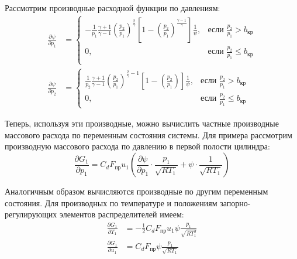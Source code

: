Рассмотрим производные расходной функции по давлениям:
\begin{equation}
\label{eq:ch2/flow_function_derivatives}
    \begin{alignedat}{6}
        \frac{\partial \psi}{\partial p_1} & = \begin{cases}
                                                   -\frac{1}{p_1}\frac{\gamma+1}{\gamma-1}\left(\frac{p_2}{p_1}\right)^{\frac{2}{\gamma}}\left[1 - \left(\frac{p_2}{p_1}\right)^{\frac{\gamma-1}{\gamma}}\right]\frac{1}{\psi}, & \text{если } \frac{p_2}{p_1} > b_\text{кр}    \\
                                                   0,                                                                                                                                                                           & \text{если } \frac{p_2}{p_1} \leq b_\text{кр} \\
                                               \end{cases} \\
        \frac{\partial \psi}{\partial p_2} & = \begin{cases}
                                                   \frac{1}{p_2}\frac{\gamma+1}{\gamma-1}\left(\frac{p_2}{p_1}\right)^{\frac{2}{\gamma}-1}\left[1 - \left(\frac{p_2}{p_1}\right)\right]\frac{1}{\psi}, & \text{если } \frac{p_2}{p_1} > b_\text{кр}    \\
                                                   0,                                                                                                                                                  & \text{если } \frac{p_2}{p_1} \leq b_\text{кр}
                                               \end{cases}
    \end{alignedat}
\end{equation}

Теперь, используя эти производные, можно вычислить частные производные массового расхода по переменным состояния системы. Для примера рассмотрим производную массового расхода по давлению в первой полости цилиндра:
\begin{equation}
\label{eq:ch2/mass_flow_derivative}
    \frac{\partial G_1}{\partial p_1} = C_d F_\text{пр} u_1 \left(\frac{\partial \psi}{\partial p_1} \cdot \frac{p_1}{\sqrt{RT_1}} + \psi \cdot \frac{1}{\sqrt{RT_1}}\right)
\end{equation}

Аналогичным образом вычисляются производные по другим переменным состояния. Для производных по температуре и положениям запорно-регулирующих элементов распределителей имеем:
\begin{equation}
\label{eq:ch2/mass_flow_derivative_T}
    \begin{aligned}
        \frac{\partial G_1}{\partial T_1} & = -\frac{1}{2} C_d F_\text{пр} u_1 \psi \frac{p_1}{\sqrt{RT_1^3}} \\
        \frac{\partial G_1}{\partial u_1} & = C_d F_\text{пр} \psi \frac{p_1}{\sqrt{RT_1}}
    \end{aligned}
\end{equation}

